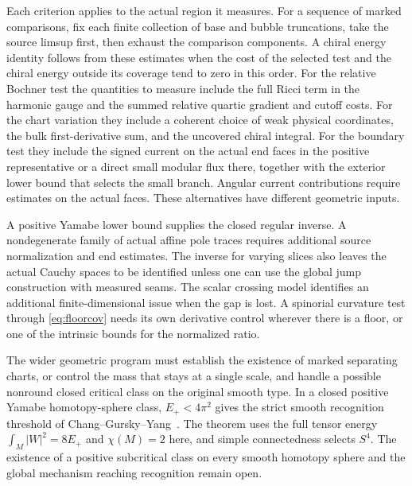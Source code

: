 \documentclass[11pt]{article}
\theoremstyle{remark}
\begin{document}
Each criterion applies to the actual region it measures. For a sequence of marked comparisons, fix each finite collection of base and bubble truncations, take the source limsup first, then exhaust the comparison components. A chiral energy identity follows from these estimates when the cost of the selected test and the chiral energy outside its coverage tend to zero in this order. For the relative Bochner test the quantities to measure include the full Ricci term in the harmonic gauge and the summed relative quartic gradient and cutoff costs. For the chart variation they include a coherent choice of weak physical coordinates, the bulk first-derivative sum, and the uncovered chiral integral. For the boundary test they include the signed current on the actual end faces in the positive representative or a direct small modular flux there, together with the exterior lower bound that selects the small branch. Angular current contributions require estimates on the actual faces. These alternatives have different geometric inputs.

A positive Yamabe lower bound supplies the closed regular inverse. A nondegenerate family of actual affine pole traces requires additional source normalization and end estimates. The inverse for varying slices also leaves the actual Cauchy spaces to be identified unless one can use the global jump construction with measured seams. The scalar crossing model identifies an additional finite-dimensional issue when the gap is lost. A spinorial curvature test through \eqref{eq:floorcov} needs its own derivative control wherever there is a floor, or one of the intrinsic bounds for the normalized ratio.

The wider geometric program must establish the existence of marked separating charts, or control the mass that stays at a single scale, and handle a possible nonround closed critical class on the original smooth type. In a closed positive Yamabe homotopy-sphere class, \(E_+<4\pi^2\) gives the strict smooth recognition threshold of Chang--Gursky--Yang~\cite[Theorem~A and Remark~2]{ChangGurskyYang2003}. The theorem uses the full tensor energy \(\int_M |W|^2=8E_+\) and \(\chi(M)=2\) here, and simple connectedness selects \(S^4\). The existence of a positive subcritical class on every smooth homotopy sphere and the global mechanism reaching recognition remain open.
\end{document}
